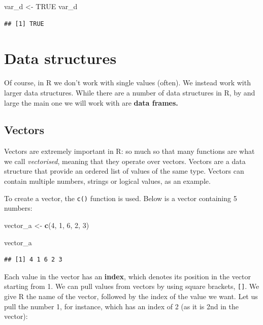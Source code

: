 \documentclass[
]{book}
\newenvironment{Shaded}{\begin{snugshade}}{\end{snugshade}}
\newcommand{\ConstantTok}[1]{\textcolor[rgb]{0.56,0.35,0.01}{#1}}
\newcommand{\DecValTok}[1]{\textcolor[rgb]{0.00,0.00,0.81}{#1}}
\newcommand{\FunctionTok}[1]{\textcolor[rgb]{0.13,0.29,0.53}{\textbf{#1}}}
\newcommand{\NormalTok}[1]{#1}
\newcommand{\OtherTok}[1]{\textcolor[rgb]{0.56,0.35,0.01}{#1}}
\begin{document}
\begin{Shaded}
\begin{Highlighting}[]
\NormalTok{var\_d }\OtherTok{\textless{}{-}} \ConstantTok{TRUE}
\NormalTok{var\_d}
\end{Highlighting}
\end{Shaded}

\begin{verbatim}
## [1] TRUE
\end{verbatim}

\hypertarget{data-structures}{%
\section{Data structures}\label{data-structures}}

Of course, in R we don't work with single values (often). We instead work with larger data structures. While there are a number of data structures in R, by and large the main one we will work with are \textbf{data frames.}

\hypertarget{vectors}{%
\subsection{Vectors}\label{vectors}}

Vectors are extremely important in R: so much so that many functions are what we call \emph{vectorised}, meaning that they operate over vectors. Vectors are a data structure that provide an ordered list of values of the same type. Vectors can contain multiple numbers, strings or logical values, as an example.

To create a vector, the \texttt{c()} function is used. Below is a vector containing 5 numbers:

\begin{Shaded}
\begin{Highlighting}[]
\NormalTok{vector\_a }\OtherTok{\textless{}{-}} \FunctionTok{c}\NormalTok{(}\DecValTok{4}\NormalTok{, }\DecValTok{1}\NormalTok{, }\DecValTok{6}\NormalTok{, }\DecValTok{2}\NormalTok{, }\DecValTok{3}\NormalTok{)}

\NormalTok{vector\_a}
\end{Highlighting}
\end{Shaded}

\begin{verbatim}
## [1] 4 1 6 2 3
\end{verbatim}

Each value in the vector has an \textbf{index}, which denotes its position in the vector starting from 1. We can pull values from vectors by using square brackets, \texttt{{[}{]}}. We give R the name of the vector, followed by the index of the value we want. Let us pull the number 1, for instance, which has an index of 2 (as it is 2nd in the vector):
\end{document}
